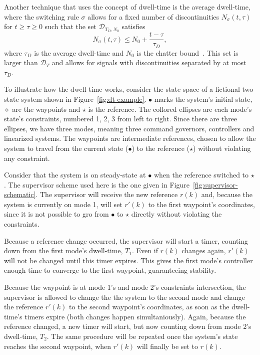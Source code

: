 Another technique that uses the concept of dwell-time is the average dwell-time,
where the switching rule \(\sigma\) allows for a fixed number of discontinuities
\(N_{\sigma}(t,\tau)\) for \(t\ge{}\tau{}\ge{}0\) such that the set
\(\mathcal{D}_{T_{D},N_{0}}\) satisfies
%
\begin{equation}
  N_{\sigma}(t,\tau) \le{} N_{0} + \frac{t-\tau}{\tau_{D}},
\end{equation}
%
where \(\tau_{D}\) is the average dwell-time and \(N_{0}\) is the chatter
bound~\parencite{hespanha.morse:stability}. This set is larger than
\(\mathcal{D}_{T}\) and allows for signals with discontinuities separated by at
most \(\tau_{D}\).

To illustrate how the dwell-time works, consider the state-space of a fictional
two-state system shown in Figure~\ref{fig:dt-example}. \(\bullet\) marks the system's
initial state, \(\diamond\) are the waypoints and \(\star\) is the reference. The collored
ellipses are each mode's state's constraints, numbered 1, 2, 3 from left to
right. Since there are three ellipses, we have three modes, meaning three
command governors, controllers and linearized systems. The waypoints are
intermediate references, chosen to allow the system to travel from the current
state (\(\bullet\)) to the reference (\(\star\)) without violating any constraint.



Consider that the system is on steady-state at \(\bullet\) when the reference switched
to \(\star\). The supervisor scheme used here is the one given in
Figure~\ref{fig:supervisor-schematic}. The supervisor will receive the new
reference \(r(k)\) and, because the system is currently on mode 1, will set
\(r'(k)\) to the first waypoint's coordinates, since it is not possible to gro
from \(\bullet\) to \(\star\) directly without violating the constraints.

Because a reference change occurred, the supervisor will start a timer, counting
down from the first mode's dwell-time, \(T_{1}\). Even if \(r(k)\) changes
again, \(r'(k)\) will not be changed until this timer expires. This gives the
first mode's controller enough time to converge to the first waypoint,
guaranteeing stability.

Because the waypoint is at mode 1's and mode 2's constraints intersection, the
supervisor is allowed to change the the system to the second mode and change the
reference \(r'(k)\) to the second waypoint's coordinates, as soon as the
dwell-time's timers expire (both changes happen simultaniously). Again, because
the reference changed, a new timer will start, but now counting down from mode
2's dwell-time, \(T_{2}\). The same procedure will be repeated once the system's
state reaches the second waypoint, when \(r'(k)\) will finally be set to
\(r(k)\).

